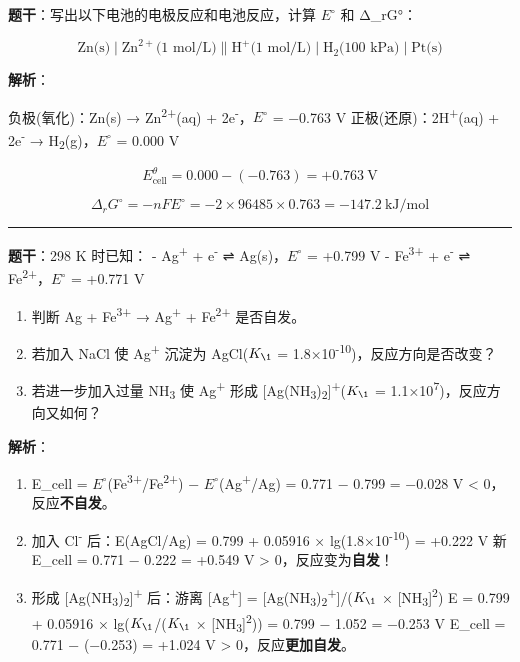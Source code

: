\documentclass[a4paper,11pt]{ctexart}
\providecommand{\tightlist}{\setlength{\itemsep}{0pt}\setlength{\parskip}{0pt}}
\begin{document}
\textbf{题干}：写出以下电池的电极反应和电池反应，计算 \(E^{\circ}\) 和 Δ\_rG°：

\[
\text{Zn(s)} \mid \text{Zn}^{2+}\text{(1 mol/L)} \| \text{H}^+\text{(1 mol/L)} \mid \text{H}_2\text{(100 kPa)} \mid \text{Pt(s)}
\]

\textbf{解析}：

负极(氧化)：Zn(s) → Zn\textsuperscript{2+}(aq) + 2e\textsuperscript{-}，\(E^{\circ}\) = −0.763 V
正极(还原)：2H\textsuperscript{+}(aq) + 2e\textsuperscript{-} → H\textsubscript{2}(g)，\(E^{\circ}\) = 0.000 V

\[E_{\text{cell}}^\theta = 0.000 - (-0.763) = +0.763\ \mathrm{V}\]

\[\Delta_rG^\circ = -nFE^\circ = -2 \times 96485 \times 0.763 = -147.2\ \mathrm{kJ/mol}\]

\begin{center}\rule{0.5\linewidth}{0.5pt}\end{center}

\textbf{题干}：298 K 时已知：
- Ag\textsuperscript{+} + e\textsuperscript{-} ⇌ Ag(s)，\(E^{\circ}\) = +0.799 V
- Fe\textsuperscript{3+} + e\textsuperscript{-} ⇌ Fe\textsuperscript{2+}，\(E^{\circ}\) = +0.771 V

\begin{enumerate}
\def\labelenumi{(\alph{enumi})}
\tightlist
\item
  判断 Ag + Fe\textsuperscript{3+} → Ag\textsuperscript{+} + Fe\textsuperscript{2+} 是否自发。
\item
  若加入 NaCl 使 Ag\textsuperscript{+} 沉淀为 AgCl(\(K_{\1}\) = 1.8×10\textsuperscript{-10})，反应方向是否改变？
\item
  若进一步加入过量 NH\textsubscript{3} 使 Ag\textsuperscript{+} 形成 {[}Ag(NH\textsubscript{3})\textsubscript{2}{]}\textsuperscript{+}(\(K_{\1}\) = 1.1×10\textsuperscript{7})，反应方向又如何？
\end{enumerate}

\textbf{解析}：

\begin{enumerate}
\def\labelenumi{(\alph{enumi})}
\item
  E\_cell = \(E^{\circ}\)(Fe\textsuperscript{3+}/Fe\textsuperscript{2+}) − \(E^{\circ}\)(Ag\textsuperscript{+}/Ag) = 0.771 − 0.799 = −0.028 V \textless{} 0，反应\textbf{不自发}。
\item
  加入 Cl\textsuperscript{-} 后：E(AgCl/Ag) = 0.799 + 0.05916 × lg(1.8×10\textsuperscript{-10}) = +0.222 V
  新 E\_cell = 0.771 − 0.222 = +0.549 V \textgreater{} 0，反应变为\textbf{自发}！
\item
  形成 {[}Ag(NH\textsubscript{3})\textsubscript{2}{]}\textsuperscript{+} 后：游离 {[}Ag\textsuperscript{+}{]} = {[}Ag(NH\textsubscript{3})\textsubscript{2}\textsuperscript{+}{]}/(\(K_{\1}\) × {[}NH\textsubscript{3}{]}\textsuperscript{2})
  E = 0.799 + 0.05916 × lg(\(K_{\1}\)/(\(K_{\1}\) × {[}NH\textsubscript{3}{]}\textsuperscript{2})) = 0.799 − 1.052 = −0.253 V
  E\_cell = 0.771 − (−0.253) = +1.024 V \textgreater{} 0，反应\textbf{更加自发}。
\end{enumerate}
\end{document}
